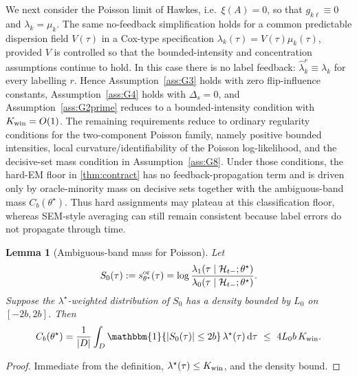 \documentclass{statsoc}
\newtheorem{lemma}[lemma]{Lemma}
\newcommand{\dd}{\mathrm{d}}
\newcommand{\1}{\mathbbm{1}}
\begin{document}
We next consider the Poisson limit of Hawkes, i.e.\ \(\xi(A)=0\), so that \(g_{k\ell}\equiv 0\) and \(\lambda_k=\mu_k\). The same no-feedback simplification holds for a common predictable dispersion field \(V(\tau)\) in a Cox-type specification \(\lambda_k(\tau)=V(\tau)\mu_k(\tau)\), provided \(V\) is controlled so that the bounded-intensity and concentration assumptions continue to hold. In this case there is no label feedback: \(\widehat\lambda_k^r\equiv \lambda_k\) for every labelling \(r\). Hence Assumption~\ref{ass:G3} holds with zero flip-influence constants, Assumption~\ref{ass:G4} holds with \(\Delta_s=0\), and Assumption~\ref{ass:G2prime} reduces to a bounded-intensity condition with \(K_{\rm win}=O(1)\). The remaining requirements reduce to ordinary regularity conditions for the two-component Poisson family, namely positive bounded intensities, local curvature/identifiability of the Poisson log-likelihood, and the decisive-set mass condition in Assumption~\ref{ass:G8}. Under those conditions, the hard-EM floor in \cref{thm:contract} has no feedback-propagation term and is driven only by oracle-minority mass on decisive sets together with the ambiguous-band mass \(C_b(\theta^\star)\). Thus hard assignments may plateau at this classification floor, whereas SEM-style averaging can still remain consistent because label errors do not propagate through time. 


\begin{lemma}[Ambiguous-band mass for Poisson]\label{lem:poisson-Cb}
Let
\[
S_0(\tau):=s^{\rm or}_{\theta^\star}(\tau)
=\log\frac{\lambda_1(\tau\mid\mathcal H_{t-};\theta^\star)}{\lambda_0(\tau\mid\mathcal H_{t-};\theta^\star)}.
\]
Suppose the $\lambda^\star$-weighted distribution of $S_0$ has a density bounded by $L_0$ on $[-2b,2b]$. Then
\[
C_b(\theta^\star)
=\frac{1}{|D|}\int_D \1\{|S_0(\tau)|\le 2b\}\,\lambda^\star(\tau)\,\dd\tau
\ \le\ 4L_0 b\,K_{\rm win}.
\]
\end{lemma}

\begin{proof}
Immediate from the definition, $\lambda^\star(\tau)\le K_{\rm win}$, and the density bound.
\end{proof}
\end{document}
